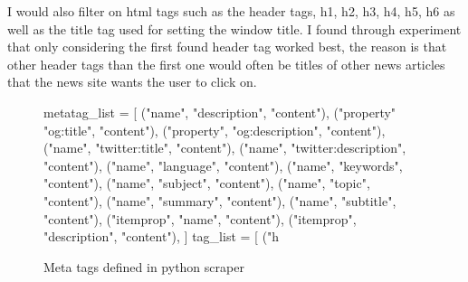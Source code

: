 \documentclass{article}
\begin{document}
I would also filter on html tags such as the header tags, h1, h2, h3, h4, h5, h6 as well as the title tag used for setting the window title. I found through experiment that only considering the first found header tag worked best, the reason is that other header tags than the first one would often be titles of other news articles that the news site wants the user to click on.
\begin{figure}[H]
\caption{Meta tags defined in python scraper}
\label{fig:python_metatags}
\begin{python}
metatag_list = [
    ("name", "description", "content"),
    ("property" "og:title", "content"),
    ("property", "og:description", "content"),
    ("name", "twitter:title", "content"),
    ("name", "twitter:description", "content"),
    ("name", "language", "content"),
    ("name", "keywords", "content"),
    ("name", "subject", "content"),
    ("name", "topic", "content"),
    ("name", "summary", "content"),
    ("name", "subtitle", "content"),
    ("itemprop", "name", "content"),
    ("itemprop", "description", "content"),
]
tag_list = [ ("h%
\end{python}
\end{figure}
\end{document}
